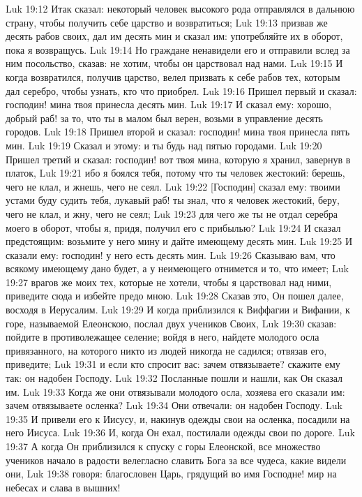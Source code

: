 Luk 19:12  Итак сказал: некоторый человек высокого рода отправлялся в дальнюю страну, чтобы получить себе царство и возвратиться;
Luk 19:13  призвав же десять рабов своих, дал им десять мин и сказал им: употребляйте их в оборот, пока я возвращусь.
Luk 19:14  Но граждане ненавидели его и отправили вслед за ним посольство, сказав: не хотим, чтобы он царствовал над нами.
Luk 19:15  И когда возвратился, получив царство, велел призвать к себе рабов тех, которым дал серебро, чтобы узнать, кто что приобрел.
Luk 19:16  Пришел первый и сказал: господин! мина твоя принесла десять мин.
Luk 19:17  И сказал ему: хорошо, добрый раб! за то, что ты в малом был верен, возьми в управление десять городов.
Luk 19:18  Пришел второй и сказал: господин! мина твоя принесла пять мин.
Luk 19:19  Сказал и этому: и ты будь над пятью городами.
Luk 19:20  Пришел третий и сказал: господин! вот твоя мина, которую я хранил, завернув в платок,
Luk 19:21  ибо я боялся тебя, потому что ты человек жестокий: берешь, чего не клал, и жнешь, чего не сеял.
Luk 19:22  [Господин] сказал ему: твоими устами буду судить тебя, лукавый раб! ты знал, что я человек жестокий, беру, чего не клал, и жну, чего не сеял;
Luk 19:23  для чего же ты не отдал серебра моего в оборот, чтобы я, придя, получил его с прибылью?
Luk 19:24  И сказал предстоящим: возьмите у него мину и дайте имеющему десять мин.
Luk 19:25  И сказали ему: господин! у него есть десять мин.
Luk 19:26  Сказываю вам, что всякому имеющему дано будет, а у неимеющего отнимется и то, что имеет;
Luk 19:27  врагов же моих тех, которые не хотели, чтобы я царствовал над ними, приведите сюда и избейте предо мною.
Luk 19:28  Сказав это, Он пошел далее, восходя в Иерусалим.
Luk 19:29  И когда приблизился к Виффагии и Вифании, к горе, называемой Елеонскою, послал двух учеников Своих,
Luk 19:30  сказав: пойдите в противолежащее селение; войдя в него, найдете молодого осла привязанного, на которого никто из людей никогда не садился; отвязав его, приведите;
Luk 19:31  и если кто спросит вас: зачем отвязываете? скажите ему так: он надобен Господу.
Luk 19:32  Посланные пошли и нашли, как Он сказал им.
Luk 19:33  Когда же они отвязывали молодого осла, хозяева его сказали им: зачем отвязываете осленка?
Luk 19:34  Они отвечали: он надобен Господу.
Luk 19:35  И привели его к Иисусу, и, накинув одежды свои на осленка, посадили на него Иисуса.
Luk 19:36  И, когда Он ехал, постилали одежды свои по дороге.
Luk 19:37  А когда Он приблизился к спуску с горы Елеонской, все множество учеников начало в радости велегласно славить Бога за все чудеса, какие видели они,
Luk 19:38  говоря: благословен Царь, грядущий во имя Господне! мир на небесах и слава в вышних!
